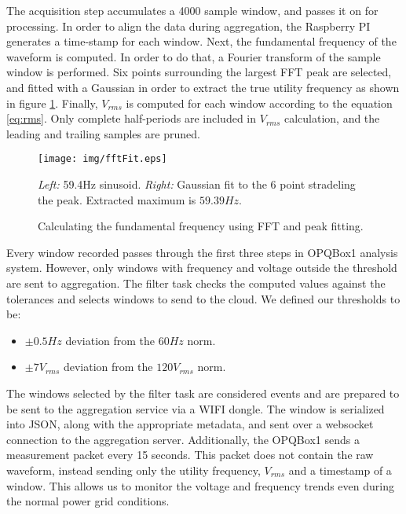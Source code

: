 The acquisition step accumulates a 4000 sample window, and passes it on for processing. In order to align the data during aggregation, the Raspberry PI generates a time-stamp for each window. Next, the fundamental frequency of the waveform is computed. In order to do that, a Fourier transform of the sample window is performed. Six points surrounding the largest FFT peak are selected, and fitted with a Gaussian in order to extract the true utility frequency as shown in figure \ref{fig:fit}. Finally,  $V_{rms}$ is computed for each window according to the equation \ref{eq:rms}.  Only complete half-periods are included in $V_{rms}$ calculation, and the leading and trailing samples are pruned. 

\begin{figure}[h!]
\begin{center}
\label{fig:fit}
\texttt{[image: img/fftFit.eps]}
\end{center}
\caption{Calculating the fundamental frequency using FFT and peak fitting.}
\begin{center}
\textit{Left:} 59.4Hz sinusoid. \textit{Right:} Gaussian fit to the 6 point stradeling the peak. Extracted maximum is $59.39Hz$.
\end{center}
\end{figure}


Every window recorded passes through the first three steps in OPQBox1 analysis system. However, only windows with frequency and voltage outside the threshold are sent to aggregation.  The filter task checks the computed values against the tolerances and selects windows to send to the cloud. We defined our thresholds to be:

\begin{itemize}
\item $\pm 0.5Hz$ deviation from the $60Hz$ norm.
\item $\pm 7V_{rms}$ deviation from the $120V_{rms}$ norm.
\end{itemize}

The windows selected by the filter task are considered events and are prepared to be sent to the aggregation service via a WIFI dongle. The window is serialized into JSON, along with the appropriate metadata, and sent over a websocket connection to the aggregation server. Additionally, the OPQBox1 sends a measurement packet every 15 seconds. This packet does not contain the raw waveform, instead sending only the utility frequency, $V_{rms}$ and a timestamp of a window. This allows us to monitor the voltage and frequency trends even during the normal power grid conditions. 

